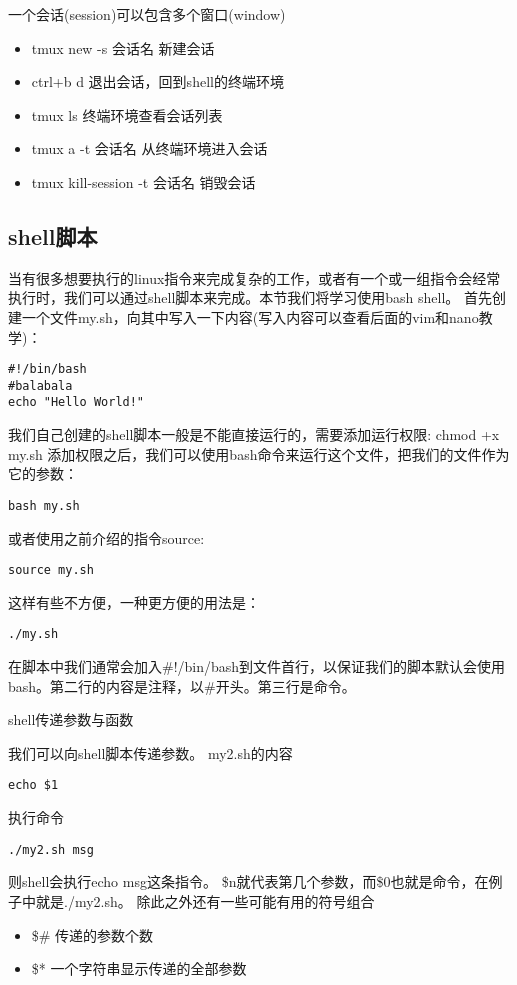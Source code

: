 一个会话(session)可以包含多个窗口(window)
\begin{itemize}
\item tmux new -s 会话名    新建会话
\item ctrl+b d    退出会话，回到shell的终端环境
\item tmux ls    终端环境查看会话列表
\item tmux a -t 会话名    从终端环境进入会话
\item tmux kill-session -t 会话名    销毁会话
\end{itemize}
\subsection{shell脚本}
当有很多想要执行的linux指令来完成复杂的工作，或者有一个或一组指令会经常执行时，我们可以通过shell脚本来完成。本节我们将学习使用bash shell。
首先创建一个文件my.sh，向其中写入一下内容(写入内容可以查看后面的vim和nano教学)：
\begin{verbatim}
#!/bin/bash
#balabala
echo "Hello World!"
\end{verbatim}
我们自己创建的shell脚本一般是不能直接运行的，需要添加运行权限:
chmod +x my.sh
添加权限之后，我们可以使用bash命令来运行这个文件，把我们的文件作为它的参数：
\begin{verbatim}
bash my.sh
\end{verbatim}
或者使用之前介绍的指令source:
\begin{verbatim}
source my.sh
\end{verbatim}
这样有些不方便，一种更方便的用法是：
\begin{verbatim}
./my.sh
\end{verbatim}
在脚本中我们通常会加入\#!/bin/bash到文件首行，以保证我们的脚本默认会使用bash。第二行的内容是注释，以\#开头。第三行是命令。

shell传递参数与函数

我们可以向shell脚本传递参数。
my2.sh的内容
\begin{verbatim}
echo $1
\end{verbatim}

执行命令
\begin{verbatim}
./my2.sh msg
\end{verbatim}

则shell会执行echo msg这条指令。
\$n就代表第几个参数，而\$0也就是命令，在例子中就是./my2.sh。
除此之外还有一些可能有用的符号组合
\begin{itemize}
\item \$\# 传递的参数个数
\item \$* 一个字符串显示传递的全部参数
\end{itemize}


